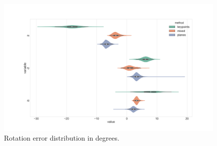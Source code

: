 \begin{figure}[h]
    \centering
    \includegraphics[width=\textwidth]{images/r_comp_small.png}
    \caption{Rotation error distribution in degrees.}
    \label{fig:r_comp}
\end{figure}

